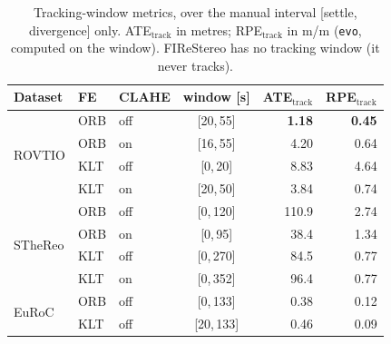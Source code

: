 \begin{table}[htbp]
\centering
\footnotesize
\caption{Tracking-window metrics, over the manual interval [settle, divergence] only. ATE$_\text{track}$ in metres; RPE$_\text{track}$ in m/m (\texttt{evo}, computed on the window). FIReStereo has no tracking window (it never tracks).}
\label{tab:r_track}
\begin{tabular}{lll c rr}
\toprule
Dataset & FE & CLAHE & window [s] & ATE$_\text{track}$ & RPE$_\text{track}$ \\
\midrule
\multirow{4}{*}{ROVTIO}  & ORB & off & [20,\,55]  & \textbf{1.18} & \textbf{0.45} \\
                         & ORB & on  & [16,\,55]  & 4.20 & 0.64 \\
                         & KLT & off & [0,\,20]   & 8.83 & 4.64 \\
                         & KLT & on  & [20,\,50]  & 3.84 & 0.74 \\
\midrule
\multirow{4}{*}{STheReo} & ORB & off & [0,\,120]  & 110.9 & 2.74 \\
                         & ORB & on  & [0,\,95]   & 38.4  & 1.34 \\
                         & KLT & off & [0,\,270]  & 84.5  & 0.77 \\
                         & KLT & on  & [0,\,352]  & 96.4  & 0.77 \\
\midrule
\multirow{2}{*}{EuRoC}   & ORB & off & [0,\,133]  & 0.38 & 0.12 \\
                         & KLT & off & [20,\,133] & 0.46 & 0.09 \\
\bottomrule
\end{tabular}
\end{table}

